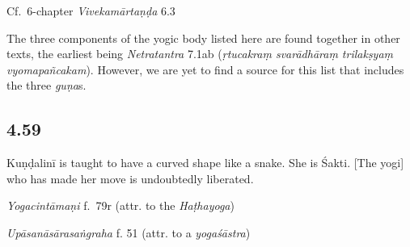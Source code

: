 \begin{ekdosis}
\begin{testimonia}[hp04_058]
Cf.~6-chapter \emph{Vivekamārtaṇḍa} 6.3
\begin{versinnote}
\end{versinnote}
\end{testimonia}

\begin{philcomm}[hp04_058]
The three components of the yogic body listed here are found together in other texts, the earliest being \emph{Netratantra} 7.1ab (\emph{ṛtucakraṃ svarādhāraṃ trilakṣyaṃ vyomapañcakam}). However, we are yet to find a source for this list that includes the three \emph{guṇa}s.
\end{philcomm}

\subsection*{4.59}
\begin{translation}[hp04_059]
Kuṇḍalinī is taught to have a curved shape like a snake. She is Śakti. [The yogi] who has made her move is undoubtedly liberated.
\end{translation}


\begin{testimonia}[hp04_059]
\emph{Yogacintāmaṇi} f.~79r (attr. to the \emph{Haṭhayoga})
\begin{versinnote}
\end{versinnote}

\emph{Upāsanāsārasaṅgraha} f. 51 (attr. to a \emph{yogaśāstra})
\begin{versinnote}
\end{versinnote}
\end{testimonia}



\end{ekdosis}
